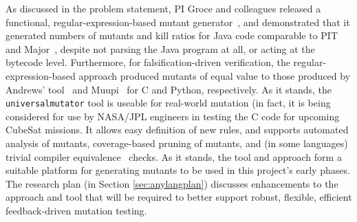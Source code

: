 As discussed in the problem statement, PI Groce and colleagues
released a functional, regular-expression-based mutant
generator~\cite{regexpMut,universalmutator}, and demonstrated that it
generated numbers of mutants and kill ratios for Java code comparable
to PIT~\cite{pittest} and Major~\cite{Major}, despite not parsing the
Java program at all, or acting at the bytecode level.  Furthermore,
for falsification-driven verification, the regular-expression-based
approach produced mutants of equal value to those produced by Andrews'
tool~\cite{mutant} and Muupi~\cite{muupi} for C and Python,
respectively.  As it stands, the {\tt universalmutator} tool is
useable for real-world mutation (in fact, it is being considered for
use by NASA/JPL engineers in testing the C code for upcoming CubeSat
missions.  It allows easy definition of new rules, and supports
automated analysis of mutants, coverage-based pruning of mutants, and
(in some languages) trivial compiler equivalence~\cite{TCE} checks.
As it stands, the tool and approach form a suitable platform for
generating mutants to be used in this project's early phases.  The
research plan (in Section \ref{sec:anylangplan}) discusses enhancements to the approach and tool that will be required
to better support robust, flexible, efficient feedback-driven mutation
testing.
